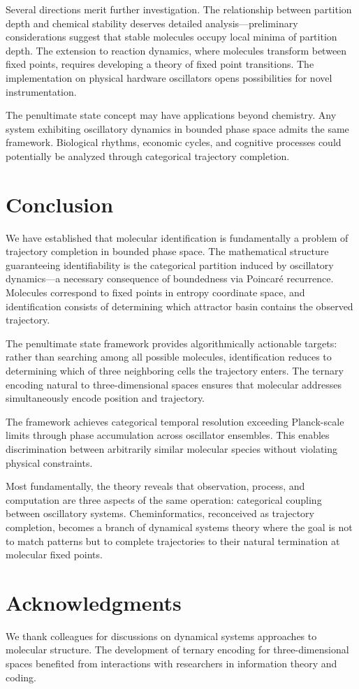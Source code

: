 \documentclass[twocolumn,10pt,a4paper]{article}
\begin{document}
Several directions merit further investigation. The relationship between partition depth and chemical stability deserves detailed analysis---preliminary considerations suggest that stable molecules occupy local minima of partition depth. The extension to reaction dynamics, where molecules transform between fixed points, requires developing a theory of fixed point transitions. The implementation on physical hardware oscillators opens possibilities for novel instrumentation.

The penultimate state concept may have applications beyond chemistry. Any system exhibiting oscillatory dynamics in bounded phase space admits the same framework. Biological rhythms, economic cycles, and cognitive processes could potentially be analyzed through categorical trajectory completion.

\section{Conclusion}

We have established that molecular identification is fundamentally a problem of trajectory completion in bounded phase space. The mathematical structure guaranteeing identifiability is the categorical partition induced by oscillatory dynamics---a necessary consequence of boundedness via Poincar\'{e} recurrence. Molecules correspond to fixed points in entropy coordinate space, and identification consists of determining which attractor basin contains the observed trajectory.

The penultimate state framework provides algorithmically actionable targets: rather than searching among all possible molecules, identification reduces to determining which of three neighboring cells the trajectory enters. The ternary encoding natural to three-dimensional spaces ensures that molecular addresses simultaneously encode position and trajectory.

The framework achieves categorical temporal resolution exceeding Planck-scale limits through phase accumulation across oscillator ensembles. This enables discrimination between arbitrarily similar molecular species without violating physical constraints.

Most fundamentally, the theory reveals that observation, process, and computation are three aspects of the same operation: categorical coupling between oscillatory systems. Cheminformatics, reconceived as trajectory completion, becomes a branch of dynamical systems theory where the goal is not to match patterns but to complete trajectories to their natural termination at molecular fixed points.

\section*{Acknowledgments}

We thank colleagues for discussions on dynamical systems approaches to molecular structure. The development of ternary encoding for three-dimensional spaces benefited from interactions with researchers in information theory and coding.



\end{document}
